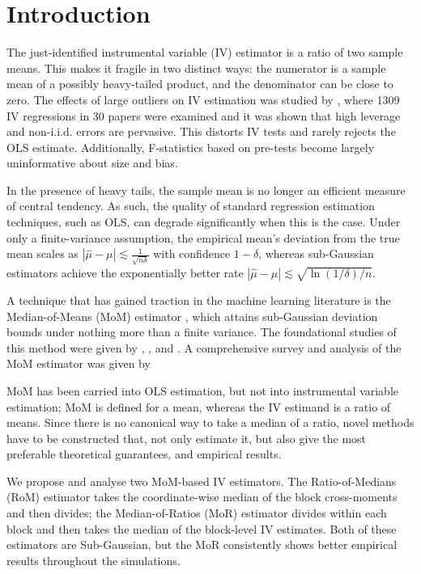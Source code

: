 \section{Introduction}

The just-identified instrumental variable (IV) estimator is a ratio of two sample means. This makes it fragile in two distinct ways: the numerator is a sample mean of a possibly heavy-tailed product, and the denominator can be close to zero. The effects of large outliers on IV estimation was studied by \citet{young2022consistency}, where 1309 IV regressions in 30 papers were examined and it was shown that high leverage and non-i.i.d. errors are pervasive. This distorts IV tests and rarely rejects the OLS estimate. Additionally, F-statistics based on pre-tests become largely uninformative about size and bias. 


In the presence of heavy tails, the sample mean is no longer an efficient measure of central tendency. As such, the quality of standard regression estimation techniques, such as OLS, can degrade significantly when this is the case. Under only a finite-variance assumption, the empirical mean's deviation from the true mean scales as $|\hat{\mu} - \mu| \lesssim \frac{1}{\sqrt{n\delta}}$ with confidence $1-\delta$, whereas sub-Gaussian estimators achieve the exponentially better rate $|\hat{\mu} - \mu| \lesssim \sqrt{\ln(1/\delta)/n}$. 


A technique that has gained traction in the machine learning literature is the Median-of-Means (MoM) estimator \citep{lecue2020robust}, which attains sub-Gaussian deviation bounds under nothing more than a finite variance. The foundational studies of this method were given by \cite{nemirovskij1983problem}, \cite{jerrum1986random}, and \cite{alon1996space}. A comprehensive survey and analysis of the MoM estimator was given by \cite{lugosi2019mean}

MoM has been carried into OLS estimation, but not into instrumental variable estimation; MoM is defined for a mean, whereas the IV estimand is a ratio of means. Since there is no canonical way to take a median of a ratio, novel methods have to be constructed that, not only estimate it, but also give the most preferable theoretical guarantees, and empirical results.


We propose and analyse two MoM-based IV estimators. The Ratio-of-Medians (RoM) estimator takes the coordinate-wise median of the block cross-moments and then divides; the Median-of-Ratios (MoR) estimator divides within each block and then takes the median of the block-level IV estimates. Both of these estimators are Sub-Gaussian, but the MoR consistently shows better empirical results throughout the simulations.

